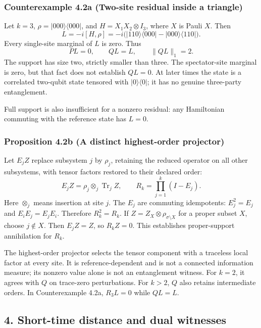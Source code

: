 \documentclass[
  11pt,
]{article}
\begin{document}
\subsubsection{Counterexample 4.2a (Two-site residual inside a triangle)}\label{counterexample-4.2a-two-site-residual-inside-a-triangle}

Let \(k=3\), \(\rho=|000\rangle\langle000|\), and
\(H=X_1X_2\otimes I_3\), where \(X\) is Pauli \(X\).
Then
\[
L=-i[H,\rho]
 =-i\bigl(|110\rangle\langle000|-|000\rangle\langle110|\bigr).
\]
Every single-site marginal of \(L\) is zero. Thus
\[
PL=0,\qquad QL=L,\qquad \|QL\|_1=2.
\]
The support has size two, strictly smaller than three. The spectator-site
marginal is zero, but that fact does not establish \(QL=0\).
At later times the state is a correlated two-qubit state tensored with
\(|0\rangle\langle0|\); it has no genuine three-party entanglement.

Full support is also insufficient for a nonzero residual: any Hamiltonian
commuting with the reference state has \(L=0\).

\subsubsection{Proposition 4.2b (A distinct highest-order projector)}\label{proposition-4.2b-a-distinct-highest-order-projector}

Let \(E_j Z\) replace subsystem \(j\) by \(\rho_j\), retaining the reduced
operator on all other subsystems, with tensor factors restored to their
declared order:
\[
E_j Z=\rho_j\otimes_j\operatorname{Tr}_j Z,\qquad
R_k=\prod_{j=1}^k(I-E_j).
\]
Here \(\otimes_j\) means insertion at site \(j\).
The \(E_j\) are commuting idempotents: \(E_j^2=E_j\) and
\(E_iE_j=E_jE_i\). Therefore \(R_k^2=R_k\).
If \(Z=Z_X\otimes\rho_{\sigma\setminus X}\) for a proper subset \(X\),
choose \(j\notin X\). Then \(E_jZ=Z\), so \(R_kZ=0\).
This establishes proper-support annihilation for \textbf{\(R_k\)}.

The highest-order projector selects the tensor component with a traceless
local factor at every site. It is reference-dependent and is not a connected
information measure; its nonzero value alone is not an entanglement witness. For \(k=2\), it agrees with
\(Q\) on trace-zero perturbations. For \(k>2\), \(Q\) also retains intermediate
orders. In Counterexample 4.2a, \(R_3L=0\) while \(QL=L\).

\subsection{4. Short-time distance and dual witnesses}\label{short-time-distance-and-dual-witnesses}
\end{document}
